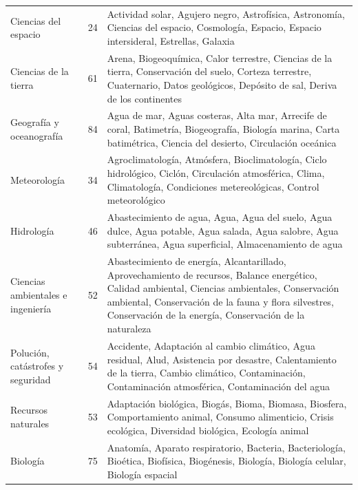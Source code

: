 \documentclass[11pt,a4paper]{article}
\begin{document}
{\begin{longtable}{p{3.5cm}P{2cm}p{9cm}}
			Ciencias del espacio & 24 & Actividad solar, Agujero negro, Astrofísica, Astronomía, Ciencias del espacio, Cosmología, Espacio, Espacio intersideral, Estrellas, Galaxia \\
			
			Ciencias de la tierra & 61 & Arena, Biogeoquímica, Calor terrestre, Ciencias de la tierra, Conservación del suelo, Corteza terrestre, Cuaternario, Datos geológicos, Depósito de sal, Deriva de los continentes \\
			
			Geografía y oceanografía & 84 & Agua de mar, Aguas costeras, Alta mar, Arrecife de coral, Batimetría, Biogeografía, Biología marina, Carta batimétrica, Ciencia del desierto, Circulación oceánica \\
			
			Meteorología & 34 & Agroclimatología, Atmósfera, Bioclimatología, Ciclo hidrológico, Ciclón, Circulación atmosférica, Clima, Climatología, Condiciones metereológicas, Control meteorológico \\
			
			Hidrología & 46 & Abastecimiento de agua, Agua, Agua del suelo, Agua dulce, Agua potable, Agua salada, Agua salobre, Agua subterránea, Agua superficial, Almacenamiento de agua \\
			
			Ciencias ambientales e ingeniería & 52 & Abastecimiento de energía, Alcantarillado, Aprovechamiento de recursos, Balance energético, Calidad ambiental, Ciencias ambientales, Conservación ambiental, Conservación de la fauna y flora silvestres, Conservación de la energía, Conservación de la naturaleza \\
			
			Polución, catástrofes y seguridad & 54 & Accidente, Adaptación al cambio climático, Agua residual, Alud, Asistencia por desastre, Calentamiento de la tierra, Cambio climático, Contaminación, Contaminación atmosférica, Contaminación del agua \\
			
			Recursos naturales & 53 & Adaptación biológica, Biogás, Bioma, Biomasa, Biosfera, Comportamiento animal, Consumo alimenticio, Crisis ecológica, Diversidad biológica, Ecología animal \\
			
			Biología & 75 & Anatomía, Aparato respiratorio, Bacteria, Bacteriología, Bioética, Biofísica, Biogénesis, Biología, Biología celular, Biología espacial \\
			

\end{longtable}}
\end{document}
